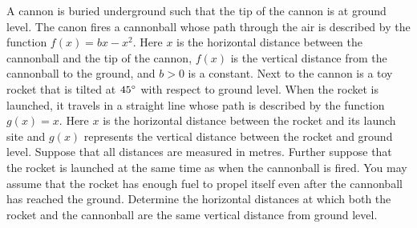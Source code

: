 \documentclass[a4paper,oneside,12pt]{article}
\begin{document}
\begin{problem}
\item A cannon is buried underground such that the tip of the cannon
  is at ground level.  The canon fires a cannonball whose path through
  the air is described by the function $f(x) = bx - x^2$.  Here $x$ is
  the horizontal distance between the cannonball and the tip of the
  cannon, $f(x)$ is the vertical distance from the cannonball to the
  ground, and $b > 0$ is a constant.  Next to the cannon is a toy
  rocket that is tilted at ${45}^{\circ}$ with respect to ground level.
  When the rocket is launched, it travels in a straight line whose
  path is described by the function $g(x) = x$.  Here $x$ is the
  horizontal distance between the rocket and its launch site and
  $g(x)$ represents the vertical distance between the rocket and
  ground level.  Suppose that all distances are measured in metres.
  Further suppose that the rocket is launched at the same time as when
  the cannonball is fired.  You may assume that the rocket has enough
  fuel to propel itself even after the cannonball has reached the
  ground.  Determine the horizontal distances at which both the rocket
  and the cannonball are the same vertical distance from ground
  level.
\end{problem}
\end{document}
